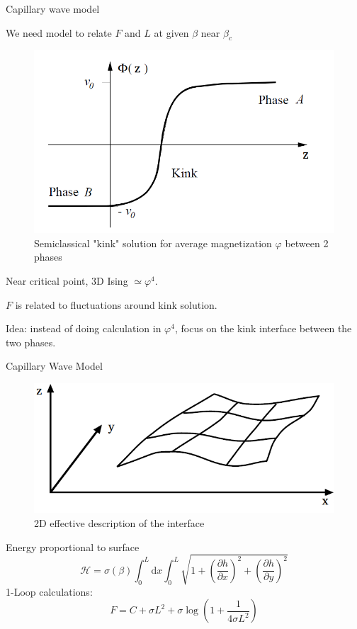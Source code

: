 \documentclass[12pt,handout]{beamer}
\begin{document}
\begin{frame}{Capillary wave model}
\begin{center}
We need model to relate $F$ and $L$ at given $\beta$ near $\beta_c$
\begin{figure}
\centering
\includegraphics[scale=0.4]{kink.png}
\caption{Semiclassical "kink" solution for average magnetization $\varphi$ between 2 phases \label{fig:kink}}
\end{figure}

Near critical point, 3D Ising $\simeq \varphi ^4$.

$F$ is related to fluctuations around kink solution.

Idea: instead of doing calculation in $\varphi^4$, focus on the kink interface between the two phases.

\end{center}
\end{frame}

\begin{frame}{Capillary Wave Model}
\begin{figure}[!htb]
\centering
\includegraphics[scale=0.4]{CWM.png}
\caption{2D effective description of the interface}
\end{figure}
\begin{center}
Energy proportional to surface
\[
	\mathcal H = \sigma\left(\beta \right) \int _0 ^{L} \mbox{d}x \int _0 ^{L} \sqrt{1 + \left(\frac{\partial h}{\partial x}\right)^2 + \left(\frac{\partial h}{\partial y}\right)^2}
\]
1-Loop calculations:
\[
	F = C + \sigma L ^2 + \sigma\log\left( 1 + \frac{1}{4\sigma L^2}\right)
\]
\end{center}
\end{frame}
\end{document}
